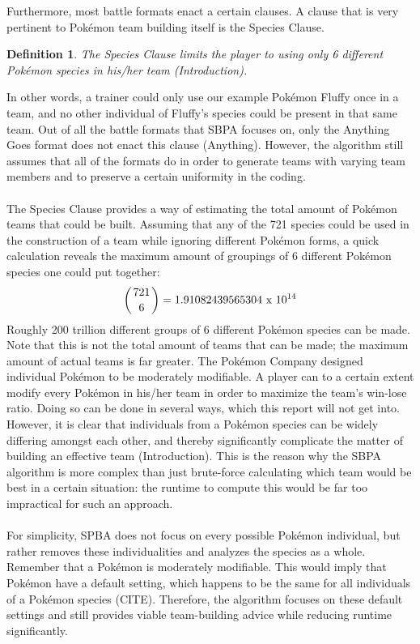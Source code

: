 \documentclass{article}
\newtheorem{definition}{Definition}
\begin{document}
Furthermore, most battle formats enact a certain clauses. A clause that is very pertinent to Pok\'emon team building itself is the Species Clause.
\begin{definition}\label{SpeciesClause}
	The Species Clause limits the player to using only 6 different Pok\'emon species in his/her team (Introduction).
\end{definition}
In other words, a trainer could only use our example Pok\'emon Fluffy once in a team, and no other individual of Fluffy's species could be present in that same team. Out of all the battle formats that SBPA focuses on, only the Anything Goes format does not enact this clause (Anything). However, the algorithm still assumes that all of the formats do in order to generate teams with varying team members and to preserve a certain uniformity in the coding.\\\\
The Species Clause provides a way of estimating the total amount of Pok\'emon teams that could be built. Assuming that any of the 721 species could be used in the construction of a team while ignoring different Pok\'emon forms, a quick calculation reveals the maximum amount of groupings of 6 different Pok\'emon species one could put together:
\begin{equation*}
	\left({721 \above 0pt 6}\right)=1.91082439565304\text{ x }10^{14}
\end{equation*}
Roughly 200 trillion different groups of 6 different Pok\'emon species can be made. Note that this is not the total amount of teams that can be made; the maximum amount of actual teams is far greater. The Pok\'emon Company designed individual Pok\'emon to be moderately modifiable. A player can to a certain extent modify every Pok\'emon in his/her team in order to maximize the team's win-lose ratio. Doing so can be done in several ways, which this report will not get into. However, it is clear that individuals from a Pok\'emon species can be widely differing amongst each other, and thereby significantly  complicate the matter of building an effective team (Introduction). This is the reason why the SBPA algorithm is more complex than just brute-force calculating which team would be best in a certain situation: the runtime to compute this would be far too impractical for such an approach.\\\\
For simplicity, SPBA does not focus on every possible Pok\'emon individual, but rather removes these individualities and analyzes the species as a whole. Remember that a Pok\'emon is moderately modifiable. This would imply that Pok\'emon have a default setting, which happens to be the same for all individuals of a Pok\'emon species (CITE). Therefore, the algorithm focuses on these default settings and still provides viable team-building advice while reducing runtime significantly.\\\\
\end{document}
